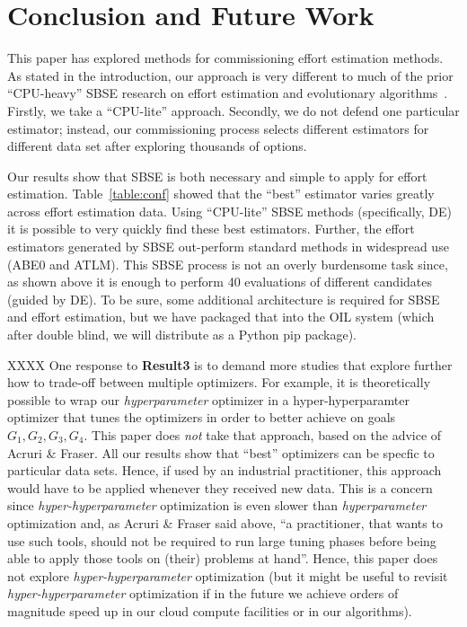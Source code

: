 \documentclass[10pt,conference]{IEEEtran}
\begin{document}
\section{Conclusion and Future Work} \label{sect:conclusion}

This paper has explored   methods for commissioning effort estimation methods. 
As stated in the introduction, our approach is very different to much of the prior 
``CPU-heavy'' SBSE research
on effort estimation and evolutionary algorithms~\cite{BURGESS2001863,879821,5635145,5598118,Lefley:2003:UGP:1756582.1756742,sarro2017adaptive,8255666,shen02a,sarro2016multi,minku2013analysis}. Firstly, we take a  ``CPU-lite'' approach. Secondly, we do not defend one particular estimator; instead, our commissioning process selects     different estimators for different data set  after exploring thousands of options.

Our results show that SBSE is both necessary and simple to apply for effort estimation. Table~\ref{table:conf} showed that the ``best'' estimator varies greatly across effort estimation data.
Using ``CPU-lite'' SBSE methods (specifically, DE) 
it is possible to very quickly find these best estimators.
Further, the effort estimators generated by SBSE  out-perform standard methods in widespread use (ABE0 and ATLM). 
This SBSE process is not an overly burdensome task since, 
as shown above it is  enough to   perform  40 evaluations of different candidates (guided by DE).
To be sure,  some additional architecture is required for SBSE and effort estimation, but  we have packaged  that into the OIL system
(which after double blind, we will  distribute as a Python pip package). 


XXXX 
One response to {\bf Result3} is to demand more studies that explore
further how to trade-off between multiple optimizers.
For example, it is theoretically possible to wrap
our {\em hyperparameter} optimizer in a hyper-hyperparamter optimizer
that tunes the optimizers in order to better achieve on goals $G_1,G_2,G_3,G_4$.  This paper does {\em not} take that approach,
based on the advice of Acruri \& Fraser. All our results show
that ``best'' optimizers can be specfic to particular data sets. Hence, if used by
an industrial practitioner, this approach would have to be applied
whenever they received new data. This is a concern
since {\em hyper-hyperparameter} optimization is even slower than
{\em hyperparameter} optimization and, as Acruri \& Fraser said above,
``a practitioner, that wants to use such tools, should not be required to run large tuning phases before being able to apply those tools on (their) problems at hand''. Hence, this paper does not explore {\em hyper-hyperparameter}
optimization (but it might be useful to revisit
{\em hyper-hyperparameter} optimization  if in the future we  achieve orders of magnitude speed up in our cloud 
compute facilities or in our algorithms).
\end{document}
